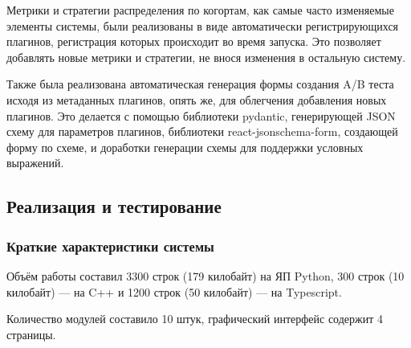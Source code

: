 \documentclass[../document.tex]{subfiles}
\begin{document}
	\par Метрики и стратегии распределения по когортам, как самые часто изменяемые элементы системы, были реализованы в виде автоматически регистрирующихся плагинов, регистрация которых происходит во время запуска. Это позволяет добавлять новые метрики и стратегии, не внося изменения в остальную систему.
	\par Также была реализована автоматическая генерация формы создания A/B теста исходя из метаданных плагинов, опять же, для облегчения добавления новых плагинов. Это делается с помощью библиотеки pydantic\cite{pydantic}, генерирующей JSON схему для параметров плагинов, библиотеки react-jsonschema-form, создающей форму по схеме, и доработки генерации схемы для поддержки условных выражений.	
	\FloatBarrier
	\subsection{Реализация и тестирование}
	\subsubsection{Краткие характеристики системы}
	\par Объём работы составил 3300 строк (179 килобайт) на ЯП Python, 300 строк (10 килобайт) --- на C++ и 1200 строк (50 килобайт) --- на Typescript.
	\par Количество модулей составило 10 штук, графический интерфейс содержит 4 страницы.
\end{document}
